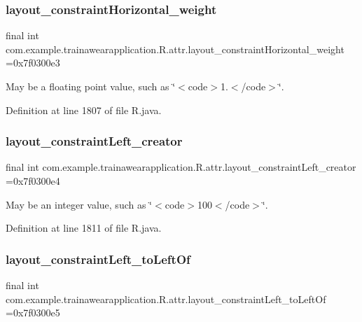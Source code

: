 \subsubsection{\texorpdfstring{layout\_constraintHorizontal\_weight}{layout\_constraintHorizontal\_weight}}
{\footnotesize\ttfamily final int com.\+example.\+trainawearapplication.\+R.\+attr.\+layout\+\_\+constraint\+Horizontal\+\_\+weight =0x7f0300e3\hspace{0.3cm}{\ttfamily [static]}}

May be a floating point value, such as \char`\"{}$<$code$>$1.$<$/code$>$\char`\"{}. 

Definition at line 1807 of file R.\+java.

\mbox{\label{classcom_1_1example_1_1trainawearapplication_1_1_r_1_1attr_aa8b57187c4090e8e86f5129ce279ff61}} 
\subsubsection{\texorpdfstring{layout\_constraintLeft\_creator}{layout\_constraintLeft\_creator}}
{\footnotesize\ttfamily final int com.\+example.\+trainawearapplication.\+R.\+attr.\+layout\+\_\+constraint\+Left\+\_\+creator =0x7f0300e4\hspace{0.3cm}{\ttfamily [static]}}

May be an integer value, such as \char`\"{}$<$code$>$100$<$/code$>$\char`\"{}. 

Definition at line 1811 of file R.\+java.

\mbox{\label{classcom_1_1example_1_1trainawearapplication_1_1_r_1_1attr_a32b56b1a1b47120acbfe3856132294f4}} 
\subsubsection{\texorpdfstring{layout\_constraintLeft\_toLeftOf}{layout\_constraintLeft\_toLeftOf}}
{\footnotesize\ttfamily final int com.\+example.\+trainawearapplication.\+R.\+attr.\+layout\+\_\+constraint\+Left\+\_\+to\+Left\+Of =0x7f0300e5\hspace{0.3cm}{\ttfamily [static]}}

